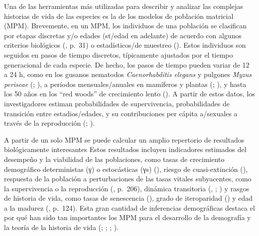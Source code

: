 \documentclass[
]{book}
\theoremstyle{definition}
\theoremstyle{definition}
\theoremstyle{definition}
\theoremstyle{definition}
\theoremstyle{remark}
\begin{document}
Una de las herramientas más utilizadas para describir y analizar las complejas historias de vida de las especies es la de los modelos de población matricial (MPM). Brevemente, en un MPM, los individuos de una población se clasifican por etapas discretas y/o edades (st/edad en adelante) de acuerdo con algunos criterios biológicos (\citet{caswell2001matrix}, p.~31) o estadísticos/de muestreo (\citet{salguero2010matrix}). Estos individuos son seguidos en pasos de tiempo discretos, típicamente ajustados por el tiempo generacional de cada especie. De hecho, los pasos de tiempo pueden variar de 12 a 24 h, como en los gusanos nematodos \emph{Caenorhabditis elegans} y pulgones \emph{Myzus periscae} (\citet{bruijning2019demographic}; \citet{li2014assessment}), a períodos mensuales/anuales en mamíferos y plantas (\citet{coulson2001age}; \citet{ferreira2016marsupial}), y hasta los 50 años en los ``red woods'' de crecimiento lento (\citet{namkoong1974extinction}). A partir de estos datos, los investigadores estiman probabilidades de supervivencia, probabilidades de transición entre estadios/edades, y su contribuciones per cápita a/sexuales a través de la reproducción (\citet{nordstrom2021fires}; \citet{omeyer2021investigating}).

A partir de un solo MPM se puede calcular un amplio repertorio de resultados biológicamente interesantes Estos resultados incluyen indicadores estimados del desempeño y la viabilidad de las poblaciones, como tasas de crecimiento demográfico deterministas (γ) o estocásticas (γs) (\citet{doak2005correctly}), riesgo de cuasi-extinción (\citet{davis2022managed}), respuesta de la población a perturbaciones de las tasas vitales subyacentes, como la supervivencia o la reproducción (\citet{fujiwara2001demography}, p.~206), dinámica transitoria (\citet{capdevila2020towards}, \citet{ezard2010matrix}; \citet{stott2011framework}) y rasgos de historia de vida, como tasas de senescencia (\citet{baudisch2013pace}), grado de iteroparidad (\citet{salguero2017fast}) y edad a la madurez (\citet{fujiwara2001demography}, p.~124). Esta gran cantidad de inferencias demográficas destaca el por qué han sido tan importantes los MPM para el desarrollo de la demografía y la teoría de la historia de vida (\citet{franco1996life}; \citet{pfister1998patterns}; \citet{saether2013life}; \citet{tuljapurkar1989uncertain}).
\end{document}
